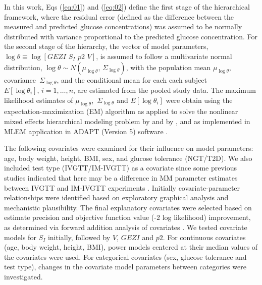 \documentclass[utf8]{frontiersSCNS} %
\begin{document}
In this work, Eqs (\ref{eq:01}) and (\ref{eq:02}) define the first stage of the hierarchical framework, where the residual error (defined as the difference between the measured and predicted glucose concentrations) was assumed to be normally distributed with variance proportional to the predicted glucose concentration. For the second stage of the hierarchy, the vector of model parameters, $\log \theta  \equiv \log \left[ {GEZI\,\,{S_I}\,\,p2\,\,V} \right]$, is assumed to follow a multivariate normal distribution, $\log \theta  \sim N\left( {{\mu_{\log \theta }},\,{\Sigma _{\log \theta }}} \right)$, with the population mean   ${\mu _{\log \theta }}$, covariance $\,{\Sigma _{\log \theta }}$, and the conditional mean for each each subject $E\left[ {\log {\theta _i}} \right],\,i = 1, \ldots ,n$, are estimated from the pooled study data. The maximum likelihood estimates of   ${\mu _{\log \theta }}$, $\,{\Sigma _{\log \theta }}$ and $E\left[ {\log {\theta _i}} \right]$ were obtain using the expectation-maximization (EM) algorithm as applied to solve the nonlinear mixed effects hierarchical modeling problem by \citet{Schumitzky1995EMAnalysis} and  by \citet{walker_1996}, and as implemented in  MLEM application in ADAPT (Version 5) software \citep{AdaptUserGuide}. 

The following covariates were examined for their influence on  model parameters: age, body weight, height, BMI, sex, and glucose tolerance (NGT/T2D). We also included  test type (IVGTT/IM-IVGTT) as a covariate since some previous studies indicated that here may be a difference in MM parameter estimates between IVGTT and IM-IVGTT experiments \citep{IM_IV_1998}. Initially covariate-parameter relationships were identified based on exploratory graphical analysis and mechanistic plausibility. The final explanatory covariates were selected based on estimate precision and objective function value (-2 log likelihood) improvement, as determined via forward addition analysis of covariates \citep{Bonate2011}. We tested covariate models for $S_I$ initially, followed by $V$, $GEZI$ and $p2$. For continuous covariates (age, body weight, height, BMI), power models centered at their median values of the covariates were used. For categorical covariates (sex, glucose tolerance and test type), changes in the covariate model parameters between categories were investigated. 

\vskip 0.5cm
\end{document}

